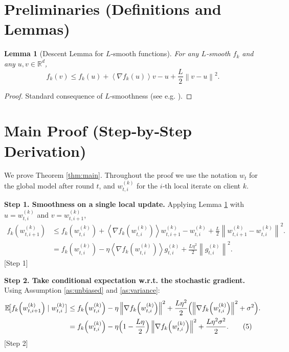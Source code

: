 \documentclass{article}
\newcommand{\E}{\mathbb{E}}
\newcommand{\R}{\mathbb{R}}
\newcommand{\norm}[1]{\left\|#1\right\|}
\newcommand{\inner}[1]{\left\langle#1\right\rangle}
\newtheorem{lemma}{Lemma}
\begin{document}
\newpage
\section*{Preliminaries (Definitions and Lemmas)}
\begin{lemma}[Descent Lemma for $L$‑smooth functions]\label{lem:descent}
For any $L$‑smooth $f_k$ and any $u,v\in\R^d$,
\[
f_k(v)\le f_k(u)+\inner{\nabla f_k(u)}{v-u}
+\frac{L}{2}\norm{v-u}^2 .
\]
\end{lemma}
\begin{proof}
Standard consequence of $L$‑smoothness (see e.g. \cite{nesterov2004introductory}). \hfill\qedsymbol
\end{proof}

\section*{Main Proof (Step‑by‑Step Derivation)}
We prove Theorem \ref{thm:main}.  Throughout the proof we
use the notation $w_t$ for the global model after round $t$, and
$w_{t,i}^{(k)}$ for the $i$‑th local iterate on client $k$.

\bigskip
\noindent\textbf{Step 1.  Smoothness on a single local update.}  
Applying Lemma \ref{lem:descent} with $u=w_{t,i}^{(k)}$ and $v=w_{t,i+1}^{(k)}$,
\begin{align}
f_k\!\left(w_{t,i+1}^{(k)}\right) 
&\le f_k\!\left(w_{t,i}^{(k)}\right)
  +\inner{\nabla f_k\!\left(w_{t,i}^{(k)}\right)}{w_{t,i+1}^{(k)}-w_{t,i}^{(k)}}
  +\frac{L}{2}\norm{w_{t,i+1}^{(k)}-w_{t,i}^{(k)}}^2 . \nonumber\\
&= f_k\!\left(w_{t,i}^{(k)}\right)
   -\eta\inner{\nabla f_k\!\left(w_{t,i}^{(k)}\right)}{g_{t,i}^{(k)}}
   +\frac{L\eta^2}{2}\norm{g_{t,i}^{(k)}}^2 .
\tag{4}
\end{align}
\hfill[Step 1]

\noindent\textbf{Step 2.  Take conditional expectation w.r.t. the stochastic gradient.}  
Using Assumption \ref{as:unbiased} and \ref{as:variance}:
\begin{align}
\E\!\bigl[f_k\!\left(w_{t,i+1}^{(k)}\right)\mid w_{t,i}^{(k)}\bigr]
&\le f_k\!\left(w_{t,i}^{(k)}\right)
   -\eta\norm{\nabla f_k\!\left(w_{t,i}^{(k)}\right)}^2
   +\frac{L\eta^2}{2}\Bigl(\norm{\nabla f_k\!\left(w_{t,i}^{(k)}\right)}^2+\sigma^2\Bigr). \nonumber\\
&= f_k\!\left(w_{t,i}^{(k)}\right)
   -\eta\Bigl(1-\frac{L\eta}{2}\Bigr)\norm{\nabla f_k\!\left(w_{t,i}^{(k)}\right)}^2
   +\frac{L\eta^2\sigma^2}{2}.
\tag{5}
\end{align}
\hfill[Step 2]
\end{document}
